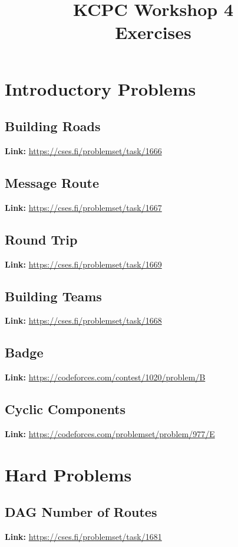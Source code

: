 \documentclass[12pt]{article}
\title{KCPC Workshop 4 \\ Exercises}
\author{}
\date{}
\begin{document}
\maketitle

\section{Introductory Problems}

\subsection{Building Roads}
\textbf{Link:} \url{https://cses.fi/problemset/task/1666}

\subsection{Message Route}
\textbf{Link:} \url{https://cses.fi/problemset/task/1667}

\subsection{Round Trip}
\textbf{Link:} \url{https://cses.fi/problemset/task/1669}

\subsection{Building Teams}
\textbf{Link:} \url{https://cses.fi/problemset/task/1668}

\subsection{Badge}
\textbf{Link:} \url{https://codeforces.com/contest/1020/problem/B}

\subsection{Cyclic Components}
\textbf{Link:} \url{https://codeforces.com/problemset/problem/977/E}

\section{Hard Problems}

\subsection{DAG Number of Routes}
\textbf{Link:} \url{https://cses.fi/problemset/task/1681}
\end{document}
